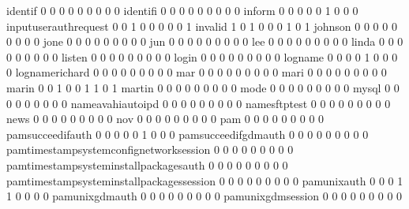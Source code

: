 \documentclass[compress,8pt]{beamer}
\begin{document}
\begin{frame}
\begin{Schunk}
  identif                                    0   0   0   0   0   0   0   0   0
  identifi                                   0   0   0   0   0   0   0   0   0
  inform                                     0   0   0   0   0   1   0   0   0
  inputuserauthrequest                       0   0   1   0   0   0   0   0   1
  invalid                                    1   0   1   0   0   0   1   0   1
  johnson                                    0   0   0   0   0   0   0   0   0
  jone                                       0   0   0   0   0   0   0   0   0
  jun                                        0   0   0   0   0   0   0   0   0
  lee                                        0   0   0   0   0   0   0   0   0
  linda                                      0   0   0   0   0   0   0   0   0
  listen                                     0   0   0   0   0   0   0   0   0
  login                                      0   0   0   0   0   0   0   0   0
  logname                                    0   0   0   0   1   0   0   0   0
  lognamerichard                             0   0   0   0   0   0   0   0   0
  mar                                        0   0   0   0   0   0   0   0   0
  mari                                       0   0   0   0   0   0   0   0   0
  marin                                      0   0   1   0   0   1   1   0   1
  martin                                     0   0   0   0   0   0   0   0   0
  mode                                       0   0   0   0   0   0   0   0   0
  mysql                                      0   0   0   0   0   0   0   0   0
  nameavahiautoipd                           0   0   0   0   0   0   0   0   0
  namesftptest                               0   0   0   0   0   0   0   0   0
  news                                       0   0   0   0   0   0   0   0   0
  nov                                        0   0   0   0   0   0   0   0   0
  pam                                        0   0   0   0   0   0   0   0   0
  pamsucceedifauth                           0   0   0   0   0   1   0   0   0
  pamsucceedifgdmauth                        0   0   0   0   0   0   0   0   0
  pamtimestampsystemconfignetworksession     0   0   0   0   0   0   0   0   0
  pamtimestampsysteminstallpackagesauth      0   0   0   0   0   0   0   0   0
  pamtimestampsysteminstallpackagessession   0   0   0   0   0   0   0   0   0
  pamunixauth                                0   0   0   1   1   0   0   0   0
  pamunixgdmauth                             0   0   0   0   0   0   0   0   0
  pamunixgdmsession                          0   0   0   0   0   0   0   0   0

\end{Schunk}
\end{frame}
\end{document}
